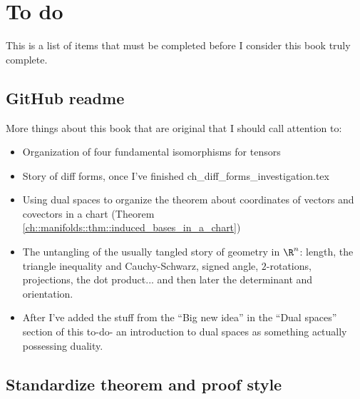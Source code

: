 \chapter*{To do}

This is a list of items that must be completed before I consider this book truly complete.

\section*{GitHub readme}

More things about this book that are original that I should call attention to:

\begin{itemize}
    \item Organization of four fundamental isomorphisms for tensors
    \item Story of diff forms, once I've finished ch\_diff\_forms\_investigation.tex
    \item Using dual spaces to organize the theorem about coordinates of vectors and covectors in a chart (Theorem \ref{ch::manifolds::thm::induced_bases_in_a_chart})
    \item The untangling of the usually tangled story of geometry in $\R^n$: length, the triangle inequality and Cauchy-Schwarz, signed angle, $2$-rotations, projections, the dot product... and then later the determinant and orientation.
    \item After I've added the stuff from the ``Big new idea'' in the ``Dual spaces'' section of this to-do- an introduction to dual spaces as something actually possessing duality.
\end{itemize}

\section*{Standardize theorem and proof style}

